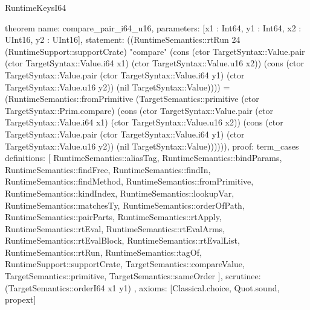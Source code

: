 \begin{lexlean}{RuntimeKeysI64}
\begin{semanticmodule}
theorem{
  name: compare_pair_i64_u16,
  parameters: [x1 : Int64, y1 : Int64, x2 : UInt16, y2 : UInt16],
  statement: ((RuntimeSemantics::rtRun 24 (RuntimeSupport::supportCrate) "compare" (cons (ctor TargetSyntax::Value.pair (ctor TargetSyntax::Value.i64 x1) (ctor TargetSyntax::Value.u16 x2)) (cons (ctor TargetSyntax::Value.pair (ctor TargetSyntax::Value.i64 y1) (ctor TargetSyntax::Value.u16 y2)) (nil TargetSyntax::Value)))) = (RuntimeSemantics::fromPrimitive (TargetSemantics::primitive (ctor TargetSyntax::Prim.compare) (cons (ctor TargetSyntax::Value.pair (ctor TargetSyntax::Value.i64 x1) (ctor TargetSyntax::Value.u16 x2)) (cons (ctor TargetSyntax::Value.pair (ctor TargetSyntax::Value.i64 y1) (ctor TargetSyntax::Value.u16 y2)) (nil TargetSyntax::Value)))))),
  proof: term_cases{
    definitions: [
      RuntimeSemantics::aliasTag,
      RuntimeSemantics::bindParams,
      RuntimeSemantics::findFree,
      RuntimeSemantics::findIn,
      RuntimeSemantics::findMethod,
      RuntimeSemantics::fromPrimitive,
      RuntimeSemantics::kindIndex,
      RuntimeSemantics::lookupVar,
      RuntimeSemantics::matchesTy,
      RuntimeSemantics::orderOfPath,
      RuntimeSemantics::pairParts,
      RuntimeSemantics::rtApply,
      RuntimeSemantics::rtEval,
      RuntimeSemantics::rtEvalArms,
      RuntimeSemantics::rtEvalBlock,
      RuntimeSemantics::rtEvalList,
      RuntimeSemantics::rtRun,
      RuntimeSemantics::tagOf,
      RuntimeSupport::supportCrate,
      TargetSemantics::compareValue,
      TargetSemantics::primitive,
      TargetSemantics::sameOrder
    ],
    scrutinee: (TargetSemantics::orderI64 x1 y1)
  },
  axioms: [Classical.choice, Quot.sound, propext]
}


\end{semanticmodule}
\end{lexlean}
